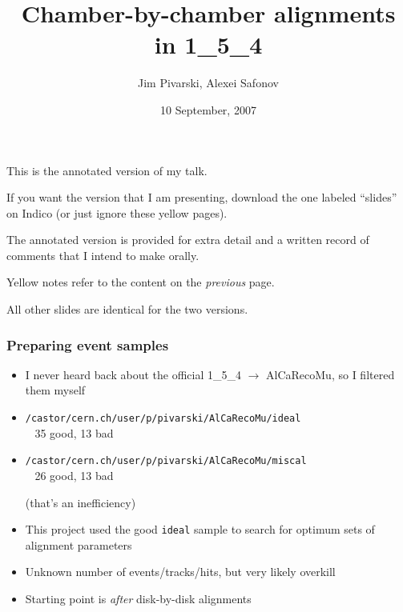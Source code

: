 \documentclass[compress]{beamer}
\title{Chamber-by-chamber alignments in 1\_5\_4}
\author{Jim Pivarski, Alexei Safonov}
\institute{Texas A\&M University}
\date{10 September, 2007}
\begin{document}
\frame{\titlepage}

\begin{notes}
\item This is the annotated version of my talk.
\item If you want the version that I am presenting, download the one
labeled ``slides'' on Indico (or just ignore these yellow pages).
\item The annotated version is provided for extra detail and a written
record of comments that I intend to make orally.
\item Yellow notes refer to the content on the {\it previous} page.
\item All other slides are identical for the two versions.
\end{notes}

\begin{frame}
\frametitle{Preparing event samples}
\begin{itemize}\setlength{\itemsep}{0.3 cm}
\item I never heard back about the official 1\_5\_4 $\to$ AlCaRecoMu, so I filtered them myself
\item {\tt \small /castor/cern.ch/user/p/pivarski/AlCaRecoMu/ideal} \\ \mbox{ } \hfill 35 good, 13 bad
\item {\tt \small /castor/cern.ch/user/p/pivarski/AlCaRecoMu/miscal} \\ \mbox{ } \hfill 26 good, 13 bad

\begin{center} (that's an inefficiency) \end{center}

\item This project used the good {\tt \small ideal} sample to search
for optimum sets of alignment parameters

\item Unknown number of events/tracks/hits, but very likely overkill

\item Starting point is {\it after} disk-by-disk alignments
\end{itemize}
\end{frame}
\end{document}
